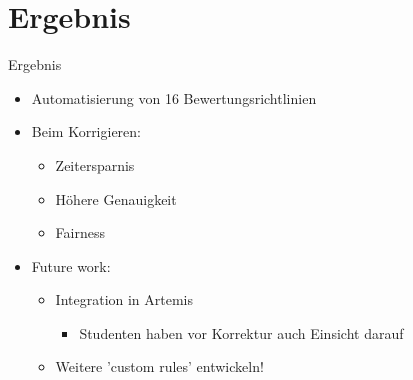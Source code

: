 \documentclass{sdqbeamer}
\begin{document}
\section{Ergebnis}
\begin{frame}{Ergebnis}
	\begin{itemize}
            \item Automatisierung von 16 Bewertungsrichtlinien
            \item Beim Korrigieren:
            \begin{itemize}
                \item Zeitersparnis
                \item Höhere Genauigkeit
                \item Fairness
            \end{itemize}
            \item Future work: 
            \begin{itemize}
                \item Integration in Artemis
                \begin{itemize}
                    \item Studenten haben vor Korrektur auch Einsicht darauf
                \end{itemize}
                \item Weitere 'custom rules' entwickeln!
            \end{itemize}
	\end{itemize}
\end{frame}

\appendix
\beginbackup
\end{document}
